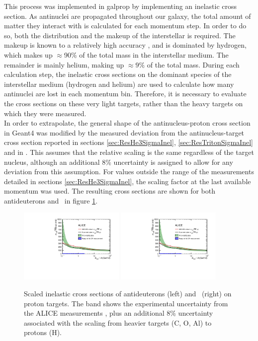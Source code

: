 This process was implemented in galprop by implementing an inelastic cross section. As antinuclei are propagated throughout our galaxy, the total amount of matter they interact with is calculated for each momentum step. In order to do so, both the distribution and the makeup of the interstellar is required. The makeup is known to a relatively high accuracy \cite{}, and is dominated by hydrogen, which makes up $\approx$90\% of the total mass in the interstellar medium. The remainder is mainly helium, making up $\approx 9\%$ of the total mass. During each calculation step, the inelastic cross sections on the dominant species of the interstellar medium (hydrogen and helium) are used to calculate how many antinuclei are lost in each momentum bin. Therefore, it is necessary to evaluate the cross sections on these very light targets, rather than the heavy targets on which they were measured.\\

In order to extrapolate, the general shape of the antinucleus-proton cross section in Geant4 was modified by the measured deviation from the antinucleus-target cross section reported in sections \ref{sec:ResHe3SigmaInel}, \ref{sec:ResTritonSigmaInel} and in \cite{}. This assumes that the relative scaling is the same regardless of the target nucleus, although an additional 8\% uncertainty is assigned to allow for any deviation from this assumption. For values outside the range of the measurements detailed in sections \ref{sec:ResHe3SigmaInel}, the scaling factor at the last available momentum was used.
The resulting cross sections are shown for both antideuterons and \ahe\ in figure \ref{fig:ScaledXS_ahe_adeut}. 

\begin{figure}
    \centering
    \includegraphics[width=0.45\textwidth]{figures/Antihelum_on_p_targets_scaled_with_paramterisation.pdf}
    \includegraphics[width=0.45\textwidth]{figures/Antihelum_on_p_targets_scaled_with_paramterisation.pdf}
    \caption{Scaled inelastic cross sections of antideuterons (left) and \ahe\ (right) on proton targets. The band shows the experimental uncertainty from the ALICE measurements \cite{}, plus an additional 8\% uncertainty associated with the scaling from heavier targets (C, O, Al) to protons (H). }
    \label{fig:ScaledXS_ahe_adeut}
\end{figure}


